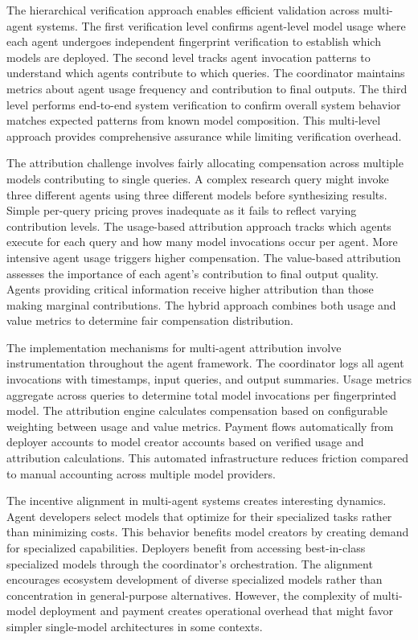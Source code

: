 The hierarchical verification approach enables efficient validation across multi-agent systems. The first verification level confirms agent-level model usage where each agent undergoes independent fingerprint verification to establish which models are deployed. The second level tracks agent invocation patterns to understand which agents contribute to which queries. The coordinator maintains metrics about agent usage frequency and contribution to final outputs. The third level performs end-to-end system verification to confirm overall system behavior matches expected patterns from known model composition. This multi-level approach provides comprehensive assurance while limiting verification overhead.

The attribution challenge involves fairly allocating compensation across multiple models contributing to single queries. A complex research query might invoke three different agents using three different models before synthesizing results. Simple per-query pricing proves inadequate as it fails to reflect varying contribution levels. The usage-based attribution approach tracks which agents execute for each query and how many model invocations occur per agent. More intensive agent usage triggers higher compensation. The value-based attribution assesses the importance of each agent's contribution to final output quality. Agents providing critical information receive higher attribution than those making marginal contributions. The hybrid approach combines both usage and value metrics to determine fair compensation distribution.

The implementation mechanisms for multi-agent attribution involve instrumentation throughout the agent framework. The coordinator logs all agent invocations with timestamps, input queries, and output summaries. Usage metrics aggregate across queries to determine total model invocations per fingerprinted model. The attribution engine calculates compensation based on configurable weighting between usage and value metrics. Payment flows automatically from deployer accounts to model creator accounts based on verified usage and attribution calculations. This automated infrastructure reduces friction compared to manual accounting across multiple model providers.

The incentive alignment in multi-agent systems creates interesting dynamics. Agent developers select models that optimize for their specialized tasks rather than minimizing costs. This behavior benefits model creators by creating demand for specialized capabilities. Deployers benefit from accessing best-in-class specialized models through the coordinator's orchestration. The alignment encourages ecosystem development of diverse specialized models rather than concentration in general-purpose alternatives. However, the complexity of multi-model deployment and payment creates operational overhead that might favor simpler single-model architectures in some contexts.

